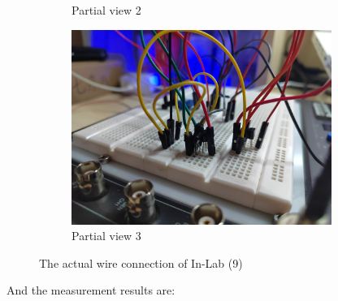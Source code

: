 \documentclass[UTF8]{report}
\theoremstyle{MyLineTheoremStyle} %
\theoremstyle{MyBlockTheoremStyle} %
\theoremstyle{MySubsubsectionStyle} %
\begin{document}
\begin{figure}[H]
\begin{subfigure}[h]{0.48\columnwidth}
        \caption{Partial view 2}
    \end{subfigure}\hfill
    \begin{subfigure}[h]{0.48\columnwidth}\centering
        \includegraphics[height=180pt]{assets/Lab1/IMG_20241017_210003.jpg}
        \caption{Partial view 3}
    \end{subfigure}
    \caption{The actual wire connection of In-Lab (9)}
\end{figure}

\noindent And the measurement results are:
\end{document}

